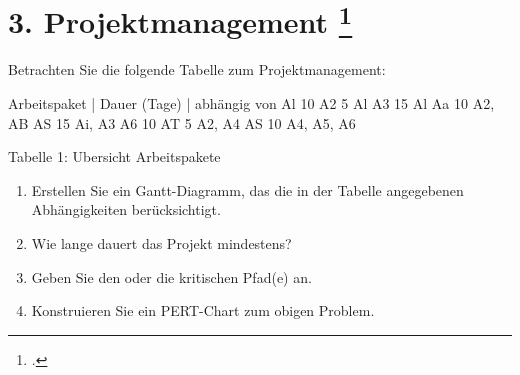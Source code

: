 \documentclass{lehramt-informatik-minimal}
\begin{document}
\section{3. Projektmanagement
\footcite[Thema 1 Teilaufgabe 1 Aufgabe 3]{examen:46116:2015:09}}

Betrachten Sie die folgende Tabelle zum Projektmanagement:

Arbeitspaket | Dauer (Tage) | abhängig von
Al 10
A2 5 Al
A3 15 Al
Aa 10 A2, AB
AS 15 Ai, A3
A6 10
AT 5 A2, A4
AS 10 A4, A5, A6

Tabelle 1: Ubersicht Arbeitspakete

\begin{enumerate}


\item Erstellen Sie ein Gantt-Diagramm, das die in der Tabelle
angegebenen Abhängigkeiten berücksichtigt.


\item Wie lange dauert das Projekt mindestens?


\item Geben Sie den oder die kritischen Pfad(e) an.


\item Konstruieren Sie ein PERT-Chart zum obigen Problem.

\end{enumerate}
\end{document}
